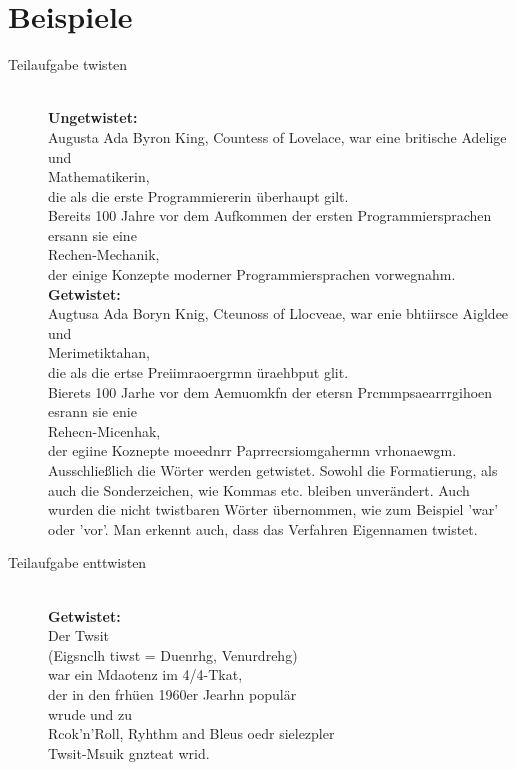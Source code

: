 \documentclass[a4paper,10pt]{scrartcl}
\begin{document}
\section{Beispiele}
\begin{description}
\item[Teilaufgabe twisten]\hfill\\

\textbf{Ungetwistet:}\\
Augusta Ada Byron King, Countess of Lovelace, war eine britische Adelige und\\ Mathematikerin,\\
die als die erste Programmiererin überhaupt gilt.\\
Bereits 100 Jahre vor dem Aufkommen der ersten Programmiersprachen ersann sie eine\\ Rechen-Mechanik,\\
der einige Konzepte moderner Programmiersprachen vorwegnahm.\\

\textbf{Getwistet:}\\
Augtusa Ada Boryn Knig, Cteunoss of Llocveae, war enie bhtiirsce Aigldee und\\ Merimetiktahan,\\
die als die ertse Preiimraoergrmn üraehbput glit.\\
Bierets 100 Jarhe vor dem Aemuomkfn der etersn Prcmmpsaearrrgihoen esrann sie enie\\ Rehecn-Micenhak,\\
der egiine Koznepte moeednrr Paprrecrsiomgahermn vrhonaewgm.\\

Ausschließlich die Wörter werden getwistet. Sowohl die Formatierung, als auch die Sonderzeichen, wie Kommas etc. bleiben unverändert. Auch wurden die nicht twistbaren Wörter übernommen, wie zum Beispiel 'war' oder 'vor'. Man erkennt auch, dass das Verfahren Eigennamen twistet.

\newpage
\item[Teilaufgabe enttwisten]\hfill\\

\textbf{Getwistet:}\\
Der Twsit\\
(Eigsnclh tiwst = Duenrhg, Venurdrehg)\\
war ein Mdaotenz im 4/4-Tkat,\\
der in den frhüen 1960er Jearhn populär\\
wrude und zu\\
Rcok'n'Roll, Ryhthm and Bleus oedr sielezpler\\
Twsit-Msuik gnzteat wrid.\\


\end{description}
\end{document}
